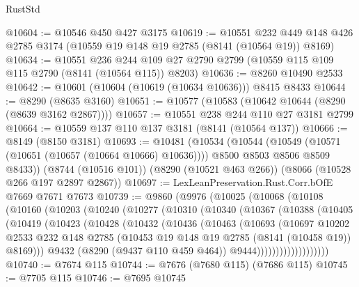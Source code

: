 \begin{lexlean}{RustStd}
\begin{coremodule}
@10604 := @10546 @450 @427 @3175
@10619 := @10551
    @232
    @449
    @148
    @426
    @2785
    @3174
    (@10559 @19 @148 @19 @2785 (@8141 (@10564 @19)) @8169)
@10634 := @10551
    @236
    @244
    @109
    @27
    @2790
    @2799
    (@10559 @115 @109 @115 @2790 (@8141 (@10564 @115)) @8203)
@10636 := @8260 @10490 @2533
@10642 := @10601 (@10604 (@10619 (@10634 @10636))) @8415 @8433
@10644 := @8290 (@8635 @3160)
@10651 := @10577 (@10583 (@10642 @10644 (@8290 (@8639 @3162 @2867))))
@10657 := @10551 @238 @244 @110 @27 @3181 @2799
@10664 := @10559 @137 @110 @137 @3181 (@8141 (@10564 @137))
@10666 := @8149 (@8150 @3181)
@10693 := @10481
    (@10534
      (@10544
        (@10549 (@10571 (@10651 (@10657 (@10664 @10666) @10636))))
        @8500
        @8503
        @8506
        @8509
        @8433))
    (@8744 (@10516 @101))
    (@8290 (@10521 @463 @266))
    (@8066 (@10528 @266 @197 @2897 @2867))
@10697 := LexLeanPreservation.Rust.Corr.bOfE @7669 @7671 @7673
@10739 := @9860
    (@9976
      (@10025
        (@10068
          (@10108
            (@10160
              (@10203
                (@10240
                  (@10277
                    (@10310
                      (@10340
                        (@10367
                          (@10388
                            (@10405
                              (@10419
                                (@10423
                                  (@10428
                                    (@10432
                                      (@10436
                                        (@10463
                                          (@10693
                                            (@10697
                                              @10202
                                              @2533
                                              @232
                                              @148
                                              @2785
                                              (@10453
                                                @19
                                                @148
                                                @19
                                                @2785
                                                (@8141 (@10458 @19))
                                                @8169)))
                                          @9432
                                          (@8290 (@9437 @110 @459 @464))
                                          @9444)))))))))))))))))))
@10740 := @7674 @115
@10744 := @7676 (@7680 @115) (@7686 @115)
@10745 := @7705 @115
@10746 := @7695 @10745

\end{coremodule}
\end{lexlean}
